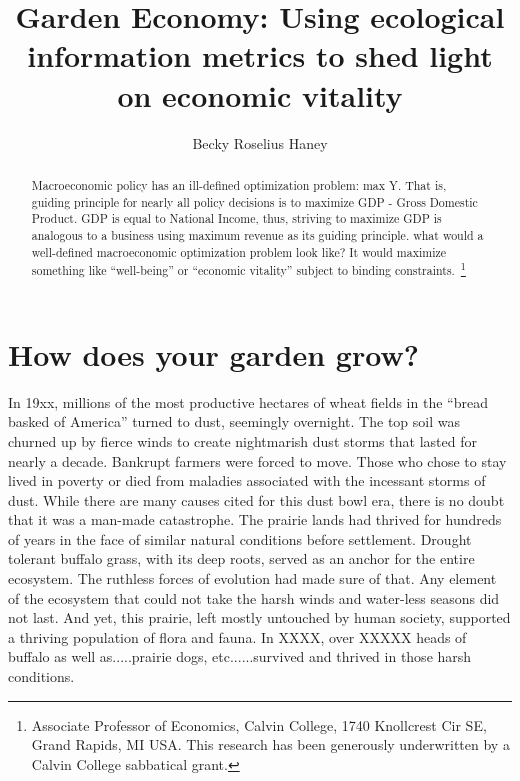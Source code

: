 \documentclass{article}
\begin{document}
 

\title{Garden Economy: Using ecological information metrics to shed light on economic vitality}
\author{Becky Roselius Haney}
\maketitle


\begin{abstract} 
Macroeconomic policy has an ill-defined optimization
problem: max Y. That is, guiding principle for nearly all
policy decisions is to maximize GDP - Gross Domestic Product. GDP
is equal to National Income, thus, striving to maximize GDP
is analogous to a business using maximum revenue as its guiding
principle. what would a well-defined macroeconomic optimization
problem look like? It would maximize something like ``well-being''
or ``economic vitality'' subject to binding constraints.~\footnote{Associate 
Professor of Economics, Calvin College, 1740 Knollcrest Cir SE, Grand Rapids, MI USA. This research
has been generously underwritten by a Calvin College 
sabbatical grant.}
\end{abstract} 


\section{How does your garden grow?}

In 19xx, millions of the most productive hectares of wheat fields
in the ``bread basked of America'' turned
to dust, seemingly overnight. The top soil was churned up by 
fierce winds to create nightmarish dust storms that lasted
for nearly a decade. Bankrupt
farmers were forced to move. Those who chose to stay lived
in poverty or died from maladies associated with the incessant
storms of dust. While there are many causes cited for 
this dust bowl era, there is no doubt that it was a man-made
catastrophe. The prairie lands had thrived for
hundreds of years in the face of similar natural conditions  before settlement.
Drought tolerant buffalo grass, with its deep roots, served
as an anchor for the entire ecosystem. The ruthless forces of 
evolution had made sure of that. Any element of the ecosystem
that could not take the harsh winds and water-less seasons
did not last. And yet, this prairie, left mostly untouched
by human society, supported a thriving population of
flora and fauna. In XXXX, over XXXXX heads of buffalo
as well as.....prairie dogs, etc......survived and thrived
in those harsh conditions.
\end{document}

